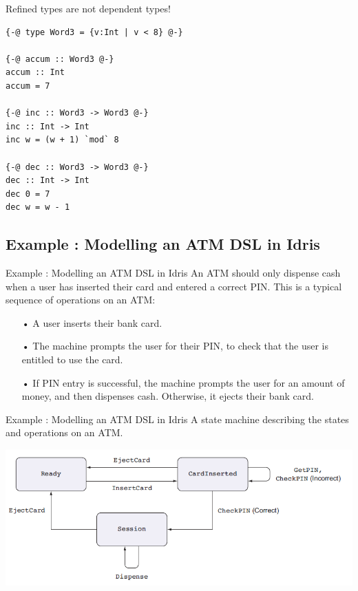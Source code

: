 \documentclass{beamer}
\newcommand{\dsltitle}{Example : Modelling an ATM DSL in Idris}
\begin{document}

\begin{frame}[fragile]{Refined types are not dependent types!}

	\begin{lstlisting}[basicstyle=\ttfamily\scriptsize]
{-@ type Word3 = {v:Int | v < 8} @-}

{-@ accum :: Word3 @-}
accum :: Int
accum = 7

{-@ inc :: Word3 -> Word3 @-}
inc :: Int -> Int
inc w = (w + 1) `mod` 8

{-@ dec :: Word3 -> Word3 @-}
dec :: Int -> Int
dec 0 = 7
dec w = w - 1
	\end{lstlisting}

\end{frame}

\subsection{\dsltitle}
\begin{frame}[fragile]{\dsltitle}
An ATM should only dispense cash when a user has inserted their
card and entered a correct PIN. This is a typical sequence of operations on an ATM:
\begin{enumerate}
\item[•] A user inserts their bank card.
\item[•] The machine prompts the user for their PIN, to check that the user is entitled to
use the card.
\item[•] If PIN entry is successful, the machine prompts the user for an amount of
money, and then dispenses cash. Otherwise, it ejects their bank card.
\end{enumerate}
\end{frame}

\begin{frame}[fragile]{\dsltitle}
A state machine describing the states and operations on an ATM.\\
\begin{center}
	\includegraphics[scale=0.5]{pics/atm-model}
\end{center}
\end{frame}
\end{document}
